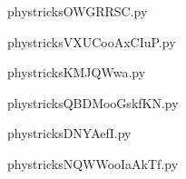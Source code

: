     \newcommand{\CaptionFigOWGRRSC}{<+Type your caption here+>}
    \begin{center}
        
    \end{center}
    phystricksOWGRRSC.py

    

    \clearpage
    


    \newcommand{\CaptionFigVXUCooAxCIuP}{<+Type your caption here+>}
    \begin{center}
        
    \end{center}
    phystricksVXUCooAxCIuP.py

    

    \clearpage
    


    \newcommand{\CaptionFigKMJQWwa}{<+Type your caption here+>}
    \begin{center}
        
    \end{center}
    phystricksKMJQWwa.py

    

    \clearpage
    


    \newcommand{\CaptionFigQBDMooGskfKN}{<+Type your caption here+>}
    \begin{center}
        
    \end{center}
    phystricksQBDMooGskfKN.py

    

    \clearpage
    


    \newcommand{\CaptionFigDNYAefI}{<+Type your caption here+>}
    \begin{center}
        
    \end{center}
    phystricksDNYAefI.py

    

    \clearpage
    


    \newcommand{\CaptionFigNQWWooIaAkTf}{<+Type your caption here+>}
    \begin{center}
        
    \end{center}
    phystricksNQWWooIaAkTf.py

